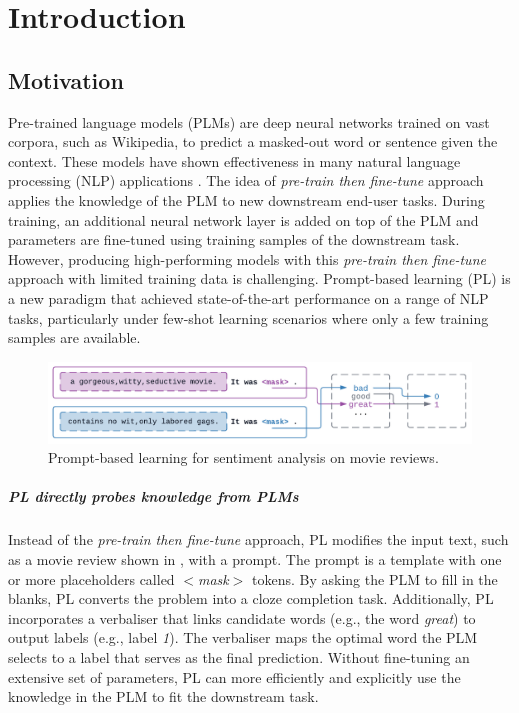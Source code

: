 \chapter{Introduction}
\section{Motivation}
\label{section:motivation}
Pre-trained language models (PLMs) are deep neural networks trained on vast corpora, such as Wikipedia, to predict a masked-out word or sentence given the context. These models have shown effectiveness in many natural language processing (NLP) applications \cite{Devlin18BERT}. The idea of \textit{pre-train then fine-tune} approach applies the knowledge of the PLM to new downstream end-user tasks. During training, an additional neural network layer is added on top of the PLM and parameters are fine-tuned using training samples of the downstream task. However, producing high-performing models with this \emph{pre-train then fine-tune} approach with limited training data is challenging. Prompt-based learning (PL) \cite{Liu21} is a new paradigm that achieved state-of-the-art performance on a range of NLP tasks, particularly under few-shot learning scenarios where only a few training samples are available.

\begin{figure}[!ht]
    \centering
    \includegraphics[width=\hsize]{figures/introduction_media/intro-pl.pdf}
    \caption{Prompt-based learning for sentiment analysis on movie reviews.}
    \label{fig:intro-pl}
\end{figure}

\vspace{-1.2em}
\paragraph{PL directly probes knowledge from PLMs} Instead of the \textit{pre-train then fine-tune} approach, PL modifies the input text, such as a movie review shown in , with a prompt. The prompt is a template with one or more placeholders called $<$\textit{mask}$>$ tokens. By asking the PLM to fill in the blanks, PL converts the problem into a cloze completion task. Additionally, PL incorporates a verbaliser that links candidate words (e.g., the word \textit{great}) to output labels (e.g., label \textit{1}). The verbaliser maps the optimal word the PLM selects to a label that serves as the final prediction. Without fine-tuning an extensive set of parameters, PL can more efficiently and explicitly use the knowledge in the PLM to fit the downstream task.

